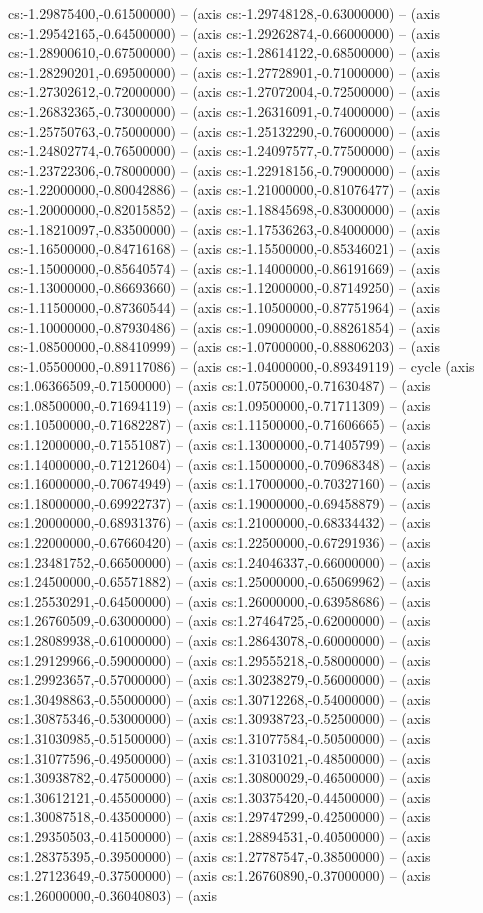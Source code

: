 cs:-1.29875400,-0.61500000) -- (axis cs:-1.29748128,-0.63000000) -- (axis cs:-1.29542165,-0.64500000) -- (axis cs:-1.29262874,-0.66000000) -- (axis cs:-1.28900610,-0.67500000) -- (axis cs:-1.28614122,-0.68500000) -- (axis cs:-1.28290201,-0.69500000) -- (axis cs:-1.27728901,-0.71000000) -- (axis cs:-1.27302612,-0.72000000) -- (axis cs:-1.27072004,-0.72500000) -- (axis cs:-1.26832365,-0.73000000) -- (axis cs:-1.26316091,-0.74000000) -- (axis cs:-1.25750763,-0.75000000) -- (axis cs:-1.25132290,-0.76000000) -- (axis cs:-1.24802774,-0.76500000) -- (axis cs:-1.24097577,-0.77500000) -- (axis cs:-1.23722306,-0.78000000) -- (axis cs:-1.22918156,-0.79000000) -- (axis cs:-1.22000000,-0.80042886) -- (axis cs:-1.21000000,-0.81076477) -- (axis cs:-1.20000000,-0.82015852) -- (axis cs:-1.18845698,-0.83000000) -- (axis cs:-1.18210097,-0.83500000) -- (axis cs:-1.17536263,-0.84000000) -- (axis cs:-1.16500000,-0.84716168) -- (axis cs:-1.15500000,-0.85346021) -- (axis cs:-1.15000000,-0.85640574) -- (axis cs:-1.14000000,-0.86191669) -- (axis cs:-1.13000000,-0.86693660) -- (axis cs:-1.12000000,-0.87149250) -- (axis cs:-1.11500000,-0.87360544) -- (axis cs:-1.10500000,-0.87751964) -- (axis cs:-1.10000000,-0.87930486) -- (axis cs:-1.09000000,-0.88261854) -- (axis cs:-1.08500000,-0.88410999) -- (axis cs:-1.07000000,-0.88806203) -- (axis cs:-1.05500000,-0.89117086) -- (axis cs:-1.04000000,-0.89349119) -- cycle (axis cs:1.06366509,-0.71500000) -- (axis cs:1.07500000,-0.71630487) -- (axis cs:1.08500000,-0.71694119) -- (axis cs:1.09500000,-0.71711309) -- (axis cs:1.10500000,-0.71682287) -- (axis cs:1.11500000,-0.71606665) -- (axis cs:1.12000000,-0.71551087) -- (axis cs:1.13000000,-0.71405799) -- (axis cs:1.14000000,-0.71212604) -- (axis cs:1.15000000,-0.70968348) -- (axis cs:1.16000000,-0.70674949) -- (axis cs:1.17000000,-0.70327160) -- (axis cs:1.18000000,-0.69922737) -- (axis cs:1.19000000,-0.69458879) -- (axis cs:1.20000000,-0.68931376) -- (axis cs:1.21000000,-0.68334432) -- (axis cs:1.22000000,-0.67660420) -- (axis cs:1.22500000,-0.67291936) -- (axis cs:1.23481752,-0.66500000) -- (axis cs:1.24046337,-0.66000000) -- (axis cs:1.24500000,-0.65571882) -- (axis cs:1.25000000,-0.65069962) -- (axis cs:1.25530291,-0.64500000) -- (axis cs:1.26000000,-0.63958686) -- (axis cs:1.26760509,-0.63000000) -- (axis cs:1.27464725,-0.62000000) -- (axis cs:1.28089938,-0.61000000) -- (axis cs:1.28643078,-0.60000000) -- (axis cs:1.29129966,-0.59000000) -- (axis cs:1.29555218,-0.58000000) -- (axis cs:1.29923657,-0.57000000) -- (axis cs:1.30238279,-0.56000000) -- (axis cs:1.30498863,-0.55000000) -- (axis cs:1.30712268,-0.54000000) -- (axis cs:1.30875346,-0.53000000) -- (axis cs:1.30938723,-0.52500000) -- (axis cs:1.31030985,-0.51500000) -- (axis cs:1.31077584,-0.50500000) -- (axis cs:1.31077596,-0.49500000) -- (axis cs:1.31031021,-0.48500000) -- (axis cs:1.30938782,-0.47500000) -- (axis cs:1.30800029,-0.46500000) -- (axis cs:1.30612121,-0.45500000) -- (axis cs:1.30375420,-0.44500000) -- (axis cs:1.30087518,-0.43500000) -- (axis cs:1.29747299,-0.42500000) -- (axis cs:1.29350503,-0.41500000) -- (axis cs:1.28894531,-0.40500000) -- (axis cs:1.28375395,-0.39500000) -- (axis cs:1.27787547,-0.38500000) -- (axis cs:1.27123649,-0.37500000) -- (axis cs:1.26760890,-0.37000000) -- (axis cs:1.26000000,-0.36040803) -- (axis 